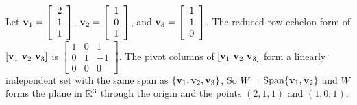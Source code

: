\begin{example}
\item Let $\mathbf{v}_1 = \left[ \begin{array}{c} 2 \\ 1 \\ 1  \end{array} \right]$, $\mathbf{v}_2 = \left[ \begin{array}{c} 1 \\ 0 \\ 1 \end{array} \right]$, and $\mathbf{v}_3 = \left[ \begin{array}{c} 1 \\ 1 \\ 0  \end{array} \right]$. The reduced row echelon form of $[\vv_1 \ \vv_2 \ \vv_3]$ is $\left[ \begin{array}{ccr} 1&0&1\\0&1&-1\\0&0&0 \end{array} \right]$. The pivot columns of $[\vv_1 \ \vv_2 \ \vv_3]$ form a linearly independent set with the same span as $\{\mathbf{v}_1, \mathbf{v}_2, \mathbf{v}_3\}$, So $W = \text{Span}\{\mathbf{v}_1, \mathbf{v}_2\}$ and $W$ forms the plane in $\mathbb{R}^3$ through the origin and the points $(2,1,1)$ and $(1,0,1)$. 

\ea

\end{example}



